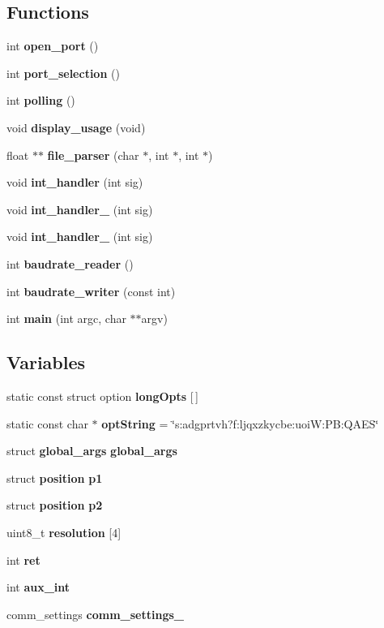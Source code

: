 \subsection*{Functions}
\begin{DoxyCompactItemize}
\item 
\mbox{\label{qbadmin_8c_abe553924eef0ba8079dc745caf1f348c}} 
int {\bfseries open\+\_\+port} ()
\item 
\mbox{\label{qbadmin_8c_a3939d4ef4a0e2be02b1eb9e1994ec985}} 
int {\bfseries port\+\_\+selection} ()
\item 
\mbox{\label{qbadmin_8c_a22b6aac07ec93fb920cc09b13175fa20}} 
int {\bfseries polling} ()
\item 
void \textbf{ display\+\_\+usage} (void)
\item 
float $\ast$$\ast$ \textbf{ file\+\_\+parser} (char $\ast$, int $\ast$, int $\ast$)
\item 
void \textbf{ int\+\_\+handler} (int sig)
\item 
void \textbf{ int\+\_\+handler\+\_} (int sig)
\item 
void \textbf{ int\+\_\+handler\+\_} (int sig)
\item 
int \textbf{ baudrate\+\_\+reader} ()
\item 
\mbox{\label{qbadmin_8c_abab28310fbbbcecb4658ce38e10ae89a}} 
int {\bfseries baudrate\+\_\+writer} (const int)
\item 
int \textbf{ main} (int argc, char $\ast$$\ast$argv)
\end{DoxyCompactItemize}
\subsection*{Variables}
\begin{DoxyCompactItemize}
\item 
\mbox{\label{qbadmin_8c_a091f2d9683d6ef802780b360f66bad67}} 
static const struct option {\bfseries long\+Opts} [$\,$]
\item 
\mbox{\label{qbadmin_8c_a1b7271ddd60c22960c39ae6caf4d5254}} 
static const char $\ast$ {\bfseries opt\+String} = \char`\"{}s\+:adgprtvh?f\+:ljqxzkycbe\+:uoi\+W\+:\+P\+B\+:\+Q\+A\+ES\char`\"{}
\item 
\mbox{\label{qbadmin_8c_ac8e0866643ba994eff3e2fa3203885e0}} 
struct \textbf{ global\+\_\+args} {\bfseries global\+\_\+args}
\item 
\mbox{\label{qbadmin_8c_a821afb7ce4f1050e40bf615da3259a67}} 
struct \textbf{ position} {\bfseries p1}
\item 
\mbox{\label{qbadmin_8c_aeb1c5de60c0abd963c4b508d9f4c3cb1}} 
struct \textbf{ position} {\bfseries p2}
\item 
\mbox{\label{qbadmin_8c_a761d62937db066110a8f3e1479e8c404}} 
uint8\+\_\+t {\bfseries resolution} [4]
\item 
\mbox{\label{qbadmin_8c_a6baa346e44f4c2158d2be4f9b77b8203}} 
int {\bfseries ret}
\item 
\mbox{\label{qbadmin_8c_abf8643fca8c83efc67b50d0f2ecc8534}} 
int {\bfseries aux\+\_\+int}
\item 
\mbox{\label{qbadmin_8c_ae80455d5ff9aa4415b211f9842cb885e}} 
comm\+\_\+settings {\bfseries comm\+\_\+settings\+\_}
\end{DoxyCompactItemize}


